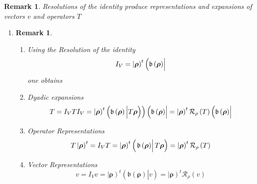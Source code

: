 \documentclass[aps,preprint]{revtex4}
\newtheorem{remark}[theorem]{Remark}
\begin{document}
\begin{remark}
Resolutions of the identity produce representations and expansions of
vectors $v$ and operators $T$
\end{remark}

\begin{enumerate}
\item 
\begin{remark}
\begin{enumerate}
\item Using the Resolution of the identity%
\begin{equation}
I_{V}=\left\vert \overset{}{\boldsymbol{\rho }}\right) ^{t}\left( \overset{}{%
\mathfrak{b}\left( \boldsymbol{\rho }\right) }\right\vert
\end{equation}%
one obtains

\item Dyadic expansions 
\begin{equation}
T=I_{V}TI_{V}=\left\vert \overset{}{\boldsymbol{\rho }}\right) ^{t}\left( 
\mathfrak{b}\left( \boldsymbol{\rho }\right) \left\vert \overset{}{T%
\boldsymbol{\rho }}\right) \right) \left( \overset{}{\mathfrak{b}\left( 
\boldsymbol{\rho }\right) }\right\vert =\left\vert \overset{}{\boldsymbol{%
\rho }}\right) ^{t}\mathcal{R}_{\rho }\left( T\right) \left( \overset{}{%
\mathfrak{b}\left( \boldsymbol{\rho }\right) }\right\vert
\end{equation}

\item Operator Representations 
\begin{equation}
T\left\vert \overset{}{\boldsymbol{\rho }}\right) ^{t}=I_{V}T=\left\vert 
\overset{}{\boldsymbol{\rho }}\right) ^{t}\left( \left. \overset{}{\mathfrak{%
b}\left( \boldsymbol{\rho }\right) }\right\vert \overset{}{T\boldsymbol{\rho 
}}\right) =\left\vert \overset{}{\boldsymbol{\rho }}\right) ^{t}\mathcal{R}%
_{\rho }\left( T\right)
\end{equation}

\item Vector Representations 
\begin{equation}
v=I_{V}v=\left\vert \overset{}{\boldsymbol{\rho }}\right) ^{t}\left( \left. 
\overset{}{\mathfrak{b}\left( \boldsymbol{\rho }\right) }\right\vert \overset%
{}{v}\right) =\left\vert \overset{}{\boldsymbol{\rho }}\right) ^{t}\mathcal{R%
}_{\rho }\left( v\right)
\end{equation}
\end{enumerate}
\end{remark}
\end{enumerate}
\end{document}
